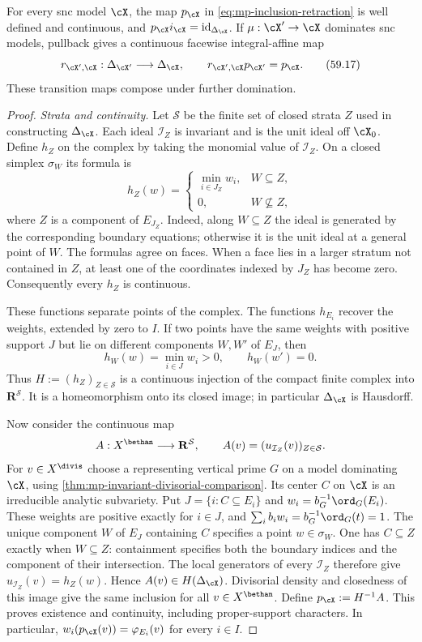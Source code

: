 \begin{lemma}\label{lem:mp-retraction}
For every snc model $\cX$, the map $p_{\cX}$ in
\eqref{eq:mp-inclusion-retraction} is well defined and continuous,
and $p_{\cX}i_{\cX}=\mathrm{id}_{\Delta_{\cX}}$.
If $\mu:\cX'\to\cX$ dominates snc models, pullback gives a
continuous facewise integral-affine map
\[
 r_{\cX',\cX}:\Delta_{\cX'}\longrightarrow\Delta_{\cX},
 \qquad r_{\cX',\cX}p_{\cX'}=p_{\cX}.
\tag{59.17}\label{eq:mp-dual-transition}
\]
These transition maps compose under further domination.
\end{lemma}

\begin{proof}
\emph{Strata and continuity.}
Let $\mathcal S$ be the finite set of closed strata $Z$
used in constructing $\Delta_{\cX}$. Each ideal
$\mathcal I_Z$ is invariant and is the unit ideal off
$\cX_0$. Define $h_Z$ on the complex by taking the
monomial value of $\mathcal I_Z$. On a closed simplex
$\sigma_W$ its formula is
\[
 h_Z(w)=
 \begin{cases}
  \min_{i\in J_Z}w_i,&W\subseteq Z,\\
  0,&W\not\subseteq Z,
 \end{cases}
\]
where $Z$ is a component of $E_{J_Z}$. Indeed, along
$W\subseteq Z$ the ideal is generated by the corresponding
boundary equations; otherwise it is the unit ideal at a
general point of $W$. The formulas agree on faces. When a
face lies in a larger stratum not contained in $Z$, at least
one of the coordinates indexed by $J_Z$ has become zero.
Consequently every $h_Z$ is continuous.

These functions separate points of the complex. The functions
$h_{E_i}$ recover the weights, extended by zero to $I$. If
two points have the same weights with positive support $J$
but lie on different components $W,W'$ of $E_J$, then
\[
 h_W(w)=\min_{i\in J}w_i>0,\qquad h_W(w')=0.
\]
Thus $H:=(h_Z)_{Z\in\mathcal S}$ is a continuous injection
of the compact finite complex into $\mathbf R^{\mathcal S}$.
It is a homeomorphism onto its closed image; in particular
$\Delta_{\cX}$ is Hausdorff.

Now consider the continuous map
\[
 A:X^{\bethan}\longrightarrow\mathbf R^{\mathcal S},
 \qquad A(v)=(u_{\mathcal I_Z}(v))_{Z\in\mathcal S}.
\]
For $v\in X^{\divis}$ choose a representing vertical prime
$G$ on a model dominating $\cX$, using
\cref{thm:mp-invariant-divisorial-comparison}. Its center
$C$ on $\cX$ is an irreducible analytic subvariety. Put
$J=\{i:C\subseteq E_i\}$ and
$w_i=b_G^{-1}\ord_G(E_i)$. These weights are positive
exactly for $i\in J$, and
$\sum_i b_iw_i=b_G^{-1}\ord_G(t)=1$.
The unique component $W$ of $E_J$ containing $C$ specifies
a point $w\in\sigma_W$. One has $C\subseteq Z$ exactly
when $W\subseteq Z$: containment specifies both the boundary
indices and the component of their intersection.
The local generators of every $\mathcal I_Z$ therefore give
$u_{\mathcal I_Z}(v)=h_Z(w)$. Hence $A(v)\in H(\Delta_{\cX})$.
Divisorial density and closedness of this image give the same
inclusion for all $v\in X^{\bethan}$. Define
$p_{\cX}:=H^{-1}A$. This proves existence and continuity,
including proper-support characters. In particular,
$w_i(p_{\cX}(v))=\varphi_{E_i}(v)$ for every $i\in I$.


\end{proof}

